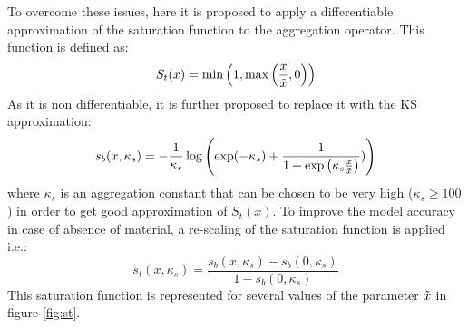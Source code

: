 To overcome these issues, here it is proposed to apply a differentiable approximation of the saturation function to the aggregation operator. This function is defined as:
 \begin{equation}
     \label{eq:satf}
     S_t(x)=\min{\left( 1, \max{\left( \frac{x}{\Tilde{x}},0\right)}\right)}
 \end{equation}
 As it is non differentiable, it is further proposed to replace it with the KS approximation:
 \begin{equation}
    s_b(x,\kappa_s)= -\frac{1}{\kappa_s}\log{\left(\exp(-\kappa_s)+\frac{1}{1+\exp{\left(\kappa_s\frac{x}{\Tilde{x}}\right)}})\right)}
 \end{equation}
 where $\kappa_s$ is an aggregation constant that can be chosen to be very high ($\kappa_s \geq 100$) in order to get good approximation of $S_t(x)$. To improve the model accuracy in case of absence of material, a re-scaling of the saturation function is applied i.e.:
 \begin{equation}
 \label{eq:st}
     s_t(x,\kappa_s)=\frac{s_b(x,\kappa_s)-s_b(0,\kappa_s)}{1-s_b(0,\kappa_s)}
 \end{equation}
 This saturation function is represented for several values of the parameter $\Tilde{x}$ in figure \ref{fig:st}.

